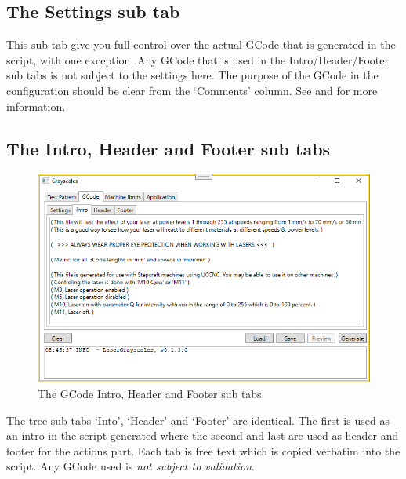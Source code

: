 \subsection{The Settings sub tab}\label{GCodeSettingsTab}

This sub tab give you full control over the actual GCode that is generated in the script, with one exception. Any GCode that is used in the Intro/Header/Footer sub tabs is
not subject to the settings here. The purpose of the GCode in the configuration should be clear from the `Comments' column. See  and
 for more information.

\subsection{The Intro, Header and Footer sub tabs}\label{GCodeIntroTab}
\begin{figure}[h!]
    \centering
    \includegraphics[width=0.8\linewidth]{./images/GCode-Intro.png}
    \caption{The GCode Intro, Header and Footer sub tabs}
\end{figure}

The tree sub tabs `Into', `Header' and `Footer' are identical. The first is used as an intro in the script generated where the second and last are used
as header and footer for the actions part. Each tab is free text which is copied verbatim into the script. Any GCode used is \emph{not subject to validation}.

\WarningCheckAndTest

